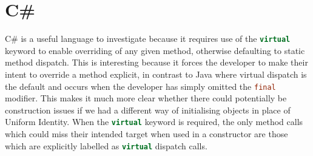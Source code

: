 \documentclass[11pt
              , a4paper
              , twoside
              , openright
              ]{report}
\newcommand{\java}[1]{\lstinline[language=Java]{#1}}
\newcommand{\cs}[1]{\lstinline[language=cs]{#1}}
\begin{document}
\section{C\#}
C\# is a useful language to investigate because it requires use of the \cs{virtual} keyword to enable overriding of any given method, otherwise defaulting to static method dispatch. This is interesting because it forces the developer to make their intent to override a method explicit, in contrast to Java where virtual dispatch is the default and occurs when the developer has simply omitted the \java{final} modifier. This makes it much more clear whether there could potentially be construction issues if we had a different way of initialising objects in place of Uniform Identity. When the \cs{virtual} keyword is required, the only method calls which could miss their intended target when used in a constructor are those which are explicitly labelled as \cs{virtual} dispatch calls.
\end{document}

